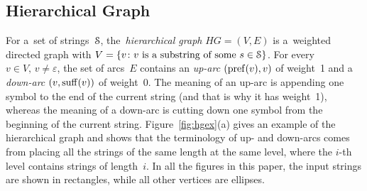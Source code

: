 \subsection{Hierarchical Graph}
\label{sec:def_hier}
For a~set of strings~${\cal S}$, the~\emph{hierarchical graph} $HG=(V,E)$ is a~weighted directed graph with $V=\{v \colon \text{$v$ is a~substring of some $s \in {\cal S}$}\}$. For every $v \in V,\, v \neq \varepsilon$, the set of arcs~$E$ contains an {\em up-arc} $(\operatorname{pref}(v), v)$ of weight~1 and a {\em down-arc} $(v, \operatorname{suff}(v))$ of weight~0. The meaning of an up-arc is appending one symbol to the end of the current string (and that is why it has weight~1), whereas the meaning of a down-arc is cutting down one symbol from the beginning of the current string.
%
Figure~\ref{fig:hgex}(a) gives an example of the hierarchical graph and shows that the terminology of up- and down-arcs comes from placing all the strings of the same length at the same level, where the $i$-th level contains strings of length~$i$.  In all the figures in this paper, the input strings are shown in rectangles, while all other vertices are ellipses.

\newcommand{\we}[4]{
\begin{scope}[xshift=#1mm,yshift=#2mm]
\foreach \n/\x/\y in {aaa/0/3, cae/1/3, aec/3/3, eee/4/3}
  \node[inputvertex] (\n) at (\x,\y) {\tt \n};
%  
\foreach \n/\x/\y in {aa/0/2, ca/1/2, ae/2/2, ec/3/2, ee/4/2, a/1/1, c/2/1, e/3/1}
  \node[vertex] (\n) at (\x,\y) {\tt \n};
%
\node[vertex] (eps) at (2,0) {$\varepsilon$};
%
\foreach \f/\t/\a in {eps/e/10, e/eps/10, eps/c/10, c/eps/10, eps/a/10, a/eps/10, a/aa/10, aa/a/10, aa/aaa/10, aaa/aa/10, c/ca/0, ca/cae/0, cae/ae/0, ae/aec/0, aec/ec/0, ee/eee/10, eee/ee/10, e/ee/10, ee/e/10, ca/a/0, a/ae/0, ae/e/0, e/ec/0, ec/c/0}
  \path (\f) edge[hgedge,bend left=\a] (\t);
  
\node at (2,-1) {(#3)};

#4
\end{scope}
}

